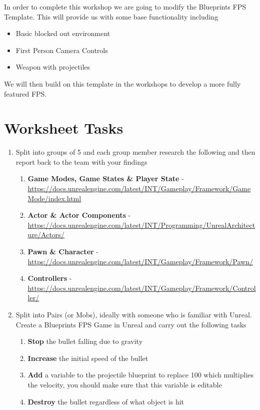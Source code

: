 \documentclass{../../../fal_assignment}
\begin{document}
In order to complete this workshop we are going to modify the Blueprints FPS Template. This will provide us with some base functionality including

\begin{itemize}
	\item Basic blocked out environment
	\item First Person Camera Controls
	\item Weapon with projectiles
\end{itemize}

We will then build on this template in the workshops to develop a more fully featured FPS.

\section*{Worksheet Tasks}

\begin{enumerate}
	\item Split into groups of 5 and each group member research the following and then report back to the team with your findings
	\begin{enumerate}[label=(\Alph*)]
		\item \textbf{Game Modes, Game States \& Player State} - \url{https://docs.unrealengine.com/latest/INT/Gameplay/Framework/GameMode/index.html}
		\item \textbf{Actor \& Actor Components} - \url{https://docs.unrealengine.com/latest/INT/Programming/UnrealArchitecture/Actors/}
		\item \textbf{Pawn \& Character} - \url{https://docs.unrealengine.com/latest/INT/Gameplay/Framework/Pawn/}
		\item \textbf{Controllers} - \url{https://docs.unrealengine.com/latest/INT/Gameplay/Framework/Controller/}
	\end{enumerate}
	\item Split into Pairs (or Mobs), ideally with someone who is familiar with Unreal. Create a Blueprints FPS Game in Unreal and carry out the following tasks
		\begin{enumerate}[label=(\Alph*)]
		\item \textbf{Stop} the bullet falling due to gravity
		\item \textbf{Increase} the initial speed of the bullet
		\item \textbf{Add} a variable to the projectile blueprint to replace 100 which multiplies the velocity, you should make sure that this variable is editable
		\item \textbf{Destroy} the bullet regardless of what object is hit
		\end{enumerate}
\end{enumerate}
\end{document}
